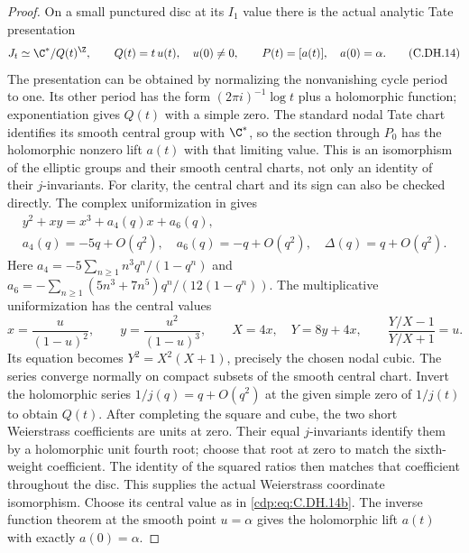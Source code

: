 \begin{proof}
On a small punctured
disc at its $I_1$ value
there is the actual
analytic Tate presentation
\[
 J_t\simeq\C^*/Q(t)^{\Z},\qquad
 Q(t)=t\,u(t),\quad u(0)\ne0,
 \qquad P(t)=[a(t)],\quad a(0)=\alpha.
                                                               \tag{C.DH.14}\label{cdp:eq:C.DH.14}
\]
The presentation can be
obtained by normalizing
the nonvanishing cycle
period to one. Its
other period has the
form $(2\pi i)^{-1}\log t$
plus a holomorphic
function; exponentiation
gives $Q(t)$ with a
simple zero. The
standard nodal Tate
chart identifies its
smooth central group
with $\C^*$, so the
section through $P_0$
has the holomorphic
nonzero lift $a(t)$
with that limiting
value. This is an
isomorphism of the
elliptic groups and
their smooth central
charts, not only an
identity of their
$j$-invariants.
For clarity, the central
chart and its sign can
also be checked directly.
The complex uniformization in \cite[Theorem~2.1 and equation~(2.1), p.~2]{Papikian2004Tate} gives
\[
 \begin{gathered}
 y^2+xy=x^3+a_4(q)x+a_6(q),\\
 a_4(q)=-5q+O(q^2),\quad
 a_6(q)=-q+O(q^2),\quad
 \Delta(q)=q+O(q^2).
 \end{gathered}                                 \tag{C.DH.14a}\label{cdp:eq:C.DH.14a}
\]
Here $a_4=-5\sum_{n\ge1}n^3q^n/(1-q^n)$ and
$a_6=-\sum_{n\ge1}(5n^3+7n^5)q^n/(12(1-q^n))$.
The multiplicative
uniformization has the
central values
\[
 x=\frac{u}{(1-u)^2},\qquad
 y=\frac{u^2}{(1-u)^3},\qquad
 X=4x,\quad Y=8y+4x,\qquad
 \frac{Y/X-1}{Y/X+1}=u.                          \tag{C.DH.14b}\label{cdp:eq:C.DH.14b}
\]
Its equation becomes
$Y^2=X^2(X+1)$, precisely
the chosen nodal cubic.
The series converge
normally on compact
subsets of the smooth
central chart. Invert
the holomorphic series
$1/j(q)=q+O(q^2)$ at
the given simple zero
of $1/j(t)$ to obtain
$Q(t)$. After completing
the square and cube,
the two short Weierstrass
coefficients are units
at zero. Their equal
$j$-invariants identify
them by a holomorphic
unit fourth root; choose
that root at zero to
match the sixth-weight
coefficient. The identity
of the squared ratios
then matches that
coefficient throughout
the disc. This supplies
the actual Weierstrass
coordinate isomorphism.
Choose its central value
as in \eqref{cdp:eq:C.DH.14b}.
The inverse function
theorem at the smooth
point $u=\alpha$ gives
the holomorphic lift
$a(t)$ with exactly
$a(0)=\alpha$.


\end{proof}
